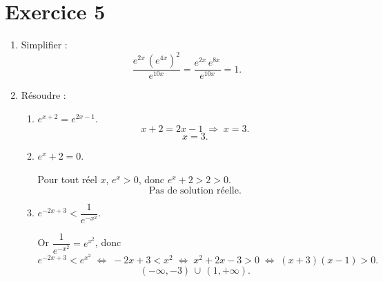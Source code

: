 \documentclass{article}
\theoremstyle{definition}
\begin{document}
\section*{Exercice 5}
\begin{enumerate}
  \item Simplifier :
    \[
      \frac{e^{2x}\,(e^{4x})^2}{e^{10x}}
      = \frac{e^{2x}\,e^{8x}}{e^{10x}}
      = 1.
    \]
  \item Résoudre :
    \begin{enumerate}
      \item $e^{x+2} = e^{2x-1}$.
        \[
          x+2 = 2x-1
          \;\Longrightarrow\;
          x = 3.
        \]
        \[
          \boxed{x=3.}
        \]

      \item $e^x + 2 = 0$.

        Pour tout réel $x$, $e^x>0$, donc $e^x+2>2>0$.  
        \[
          \boxed{\text{Pas de solution réelle.}}
        \]

      \item $e^{-2x+3} < \dfrac1{e^{-x^2}}$.

        Or $\dfrac1{e^{-x^2}} = e^{x^2}$, donc
        \[
          e^{-2x+3} < e^{x^2}
          \;\Longleftrightarrow\;
          -2x+3 < x^2
          \;\Longleftrightarrow\;
          x^2 +2x -3 >0
          \;\Longleftrightarrow\;
          (x+3)(x-1)>0.
        \]
        \[
          \boxed{(-\infty,-3)\,\cup\,(1,+\infty).}
        \]
    \end{enumerate}
\end{enumerate}
\end{document}
